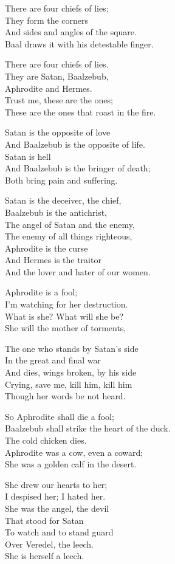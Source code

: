 \documentclass[
]{book}
\begin{document}
There are four chiefs of lies;\\
They form the corners\\
And sides and angles of the square.\\
Baal draws it with his detestable finger.

There are four chiefs of lies.\\
They are Satan, Baalzebub,\\
Aphrodite and Hermes.\\
Trust me, these are the ones;\\
These are the ones that roast in the fire.

Satan is the opposite of love\\
And Baalzebub is the opposite of life.\\
Satan is hell\\
And Baalzebub is the bringer of death;\\
Both bring pain and suffering.

Satan is the deceiver, the chief,\\
Baalzebub is the antichrist,\\
The angel of Satan and the enemy,\\
The enemy of all things righteous,\\
Aphrodite is the curse\\
And Hermes is the traitor\\
And the lover and hater of our women.

Aphrodite is a fool;\\
I'm watching for her destruction.\\
What is she? What will she be?\\
She will the mother of torments,

The one who stands by Satan's side\\
In the great and final war\\
And dies, wings broken, by his side\\
Crying, save me, kill him, kill him\\
Though her words be not heard.

So Aphrodite shall die a fool;\\
Baalzebub shall strike the heart of the duck.\\
The cold chicken dies.\\
Aphrodite was a cow, even a coward;\\
She was a golden calf in the desert.

She drew our hearts to her;\\
I despised her; I hated her.\\
She was the angel, the devil\\
That stood for Satan\\
To watch and to stand guard\\
Over Veredel, the leech.\\
She is herself a leech.
\end{document}
